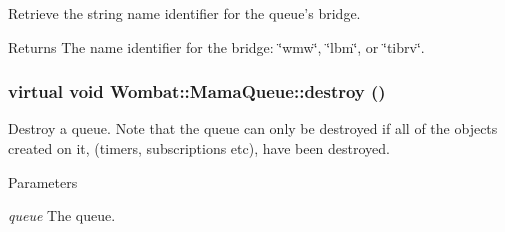 Retrieve the string name identifier for the queue's bridge. \begin{DoxyReturn}{Returns}
The name identifier for the bridge: \char`\"{}wmw\char`\"{}, \char`\"{}lbm\char`\"{}, or \char`\"{}tibrv\char`\"{}. 
\end{DoxyReturn}
\hypertarget{classWombat_1_1MamaQueue_af2833301877225698f9d01c19b4ff509}{
\subsubsection[{destroy}]{\setlength{\rightskip}{0pt plus 5cm}virtual void Wombat::MamaQueue::destroy ()}}
\label{classWombat_1_1MamaQueue_af2833301877225698f9d01c19b4ff509}


Destroy a queue. Note that the queue can only be destroyed if all of the objects created on it, (timers, subscriptions etc), have been destroyed.


\begin{DoxyParams}{Parameters}
\item[{\em queue}]The queue. \end{DoxyParams}

